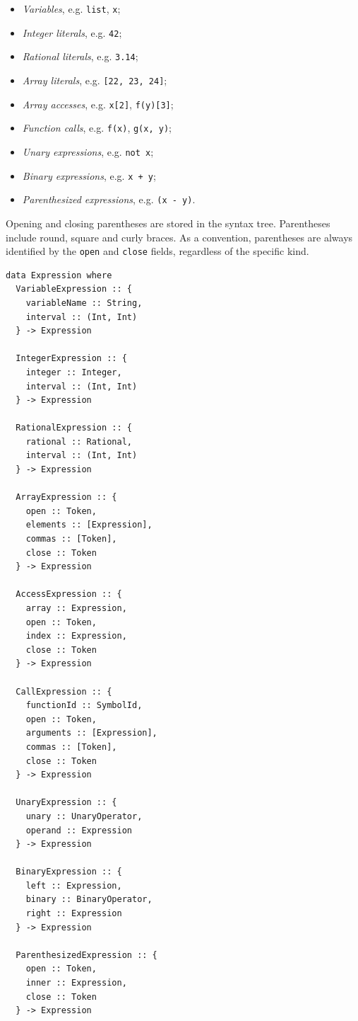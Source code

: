 \documentclass[11pt, american, draft]{PhdThesis}
\begin{document}
  \begin{itemize}[noitemsep,topsep=0pt]
    \item \emph{Variables}, e.g. \verb$list$, \verb$x$;
    \item \emph{Integer literals}, e.g. \verb$42$;
    \item \emph{Rational literals}, e.g. \verb$3.14$;
    \item \emph{Array literals}, e.g. \verb$[22, 23, 24]$;
    \item \emph{Array accesses}, e.g. \verb$x[2]$, \verb$f(y)[3]$;
    \item \emph{Function calls}, e.g. \verb$f(x)$, \verb$g(x, y)$;
    \item \emph{Unary expressions}, e.g. \verb$not x$;
    \item \emph{Binary expressions}, e.g. \verb$x + y$;
    \item \emph{Parenthesized expressions}, e.g. \verb$(x - y)$.
  \end{itemize}

  Opening and closing parentheses are stored in the syntax tree. Parentheses include round, square
  and curly braces. As a convention, parentheses are always identified by the \verb$open$ and
  \verb$close$ fields, regardless of the specific kind.

  \begin{verbatim}
data Expression where
  VariableExpression :: {
    variableName :: String,
    interval :: (Int, Int)
  } -> Expression

  IntegerExpression :: {
    integer :: Integer,
    interval :: (Int, Int)
  } -> Expression

  RationalExpression :: {
    rational :: Rational,
    interval :: (Int, Int)
  } -> Expression

  ArrayExpression :: {
    open :: Token,
    elements :: [Expression],
    commas :: [Token],
    close :: Token
  } -> Expression

  AccessExpression :: {
    array :: Expression,
    open :: Token,
    index :: Expression,
    close :: Token
  } -> Expression

  CallExpression :: {
    functionId :: SymbolId,
    open :: Token,
    arguments :: [Expression],
    commas :: [Token],
    close :: Token
  } -> Expression

  UnaryExpression :: {
    unary :: UnaryOperator,
    operand :: Expression
  } -> Expression

  BinaryExpression :: {
    left :: Expression,
    binary :: BinaryOperator,
    right :: Expression
  } -> Expression

  ParenthesizedExpression :: {
    open :: Token,
    inner :: Expression,
    close :: Token
  } -> Expression
  \end{verbatim}
\end{document}
